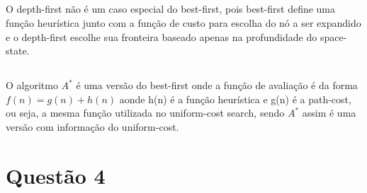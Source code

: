 \documentclass[a4paper,12pt]{article}
\begin{document}
\subsection{}
O depth-first não é um caso especial do best-first, pois best-first define uma função heurística junto com a função de custo para escolha do nó a ser expandido e o depth-first escolhe sua fronteira baseado apenas na profundidade do space-state.
\subsection{}
O algoritmo $A^*$ é uma versão do best-first onde a função de avaliação é da forma $f(n) = g(n) + h(n)$ aonde h(n) é a função heurística e g(n) é a path-cost, ou seja, a mesma função utilizada no uniform-cost search, sendo $A^*$ assim é uma versão com informação do uniform-cost.  
\section{Questão 4}
\end{document}
